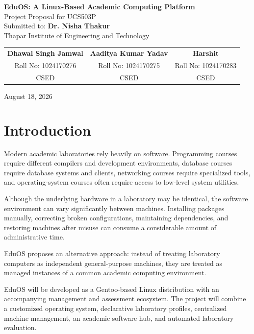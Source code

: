 \documentclass[12pt,a4paper]{article}
\begin{document}
\begin{center}

{\LARGE \textbf{EduOS: A Linux-Based Academic Computing Platform}}\\[0.8em]

{\large Project Proposal for UCS503P}\\[1em]

Submitted to: \textbf{Dr. Nisha Thakur}\\
Thapar Institute of Engineering and Technology\\[1em]

\begin{tabular}{ccc}
\textbf{Dhawal Singh Jamwal} & \textbf{Aaditya Kumar Yadav} & \textbf{Harshit} \\
Roll No: 1024170276 & Roll No: 1024170275 & Roll No: 1024170283 \\
CSED & CSED & CSED \\
\end{tabular}

August 18, 2026

\end{center}

\section{Introduction}

Modern academic laboratories rely heavily on software. Programming courses require different compilers and development environments, database courses require database systems and clients, networking courses require specialized tools, and operating-system courses often require access to low-level system utilities.

Although the underlying hardware in a laboratory may be identical, the software environment can vary significantly between machines. Installing packages manually, correcting broken configurations, maintaining dependencies, and restoring machines after misuse can consume a considerable amount of administrative time.

EduOS proposes an alternative approach: instead of treating laboratory computers as independent general-purpose machines, they are treated as managed instances of a common academic computing environment.

EduOS will be developed as a Gentoo-based Linux distribution with an accompanying management and assessment ecosystem. The project will combine a customized operating system, declarative laboratory profiles, centralized machine management, an academic software hub, and automated laboratory evaluation.
\end{document}
